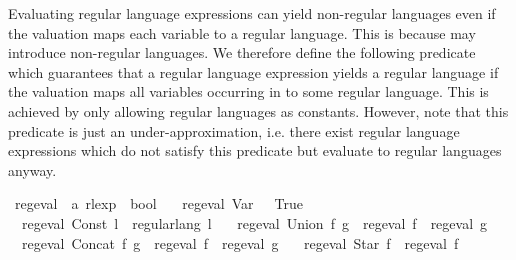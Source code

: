 \begin{isabellebody}
{}
\isamarkuptrue%
%
\endisatagdocument
{\isafolddocument}%
%
\isadelimdocument
%
\endisadelimdocument
%
\begin{isamarkuptext}%
Evaluating regular language expressions can yield non-regular languages even if
the valuation maps each variable to a regular language. This is because  may introduce
non-regular languages.
We therefore define the following predicate which guarantees that a regular language expression
 yields a regular language if the valuation maps all variables occurring in  to some regular
language. This is achieved by only allowing regular languages as constants.
However, note that this predicate is just an under-approximation, i.e. there exist regular language
expressions which do not satisfy this predicate but evaluate to regular languages anyway.%
\end{isamarkuptext}\isamarkuptrue%
\isamarkupfalse%
\ reg{\isacharunderscore}{\kern0pt}eval\ {\isacharcolon}{\kern0pt}{\isacharcolon}{\kern0pt}\ {\isachardoublequoteopen}{\isacharprime}{\kern0pt}a\ rlexp\ {\isasymRightarrow}\ bool{\isachardoublequoteclose}\ \isanewline
\ \ {\isachardoublequoteopen}reg{\isacharunderscore}{\kern0pt}eval\ {\isacharparenleft}{\kern0pt}Var\ {\isacharunderscore}{\kern0pt}{\isacharparenright}{\kern0pt}\ {\isasymlongleftrightarrow}\ True{\isachardoublequoteclose}\ {\isacharbar}{\kern0pt}\isanewline
\ \ {\isachardoublequoteopen}reg{\isacharunderscore}{\kern0pt}eval\ {\isacharparenleft}{\kern0pt}Const\ l{\isacharparenright}{\kern0pt}\ {\isasymlongleftrightarrow}\ regular{\isacharunderscore}{\kern0pt}lang\ l{\isachardoublequoteclose}\ {\isacharbar}{\kern0pt}\isanewline
\ \ {\isachardoublequoteopen}reg{\isacharunderscore}{\kern0pt}eval\ {\isacharparenleft}{\kern0pt}Union\ f\ g{\isacharparenright}{\kern0pt}\ {\isasymlongleftrightarrow}\ reg{\isacharunderscore}{\kern0pt}eval\ f\ {\isasymand}\ reg{\isacharunderscore}{\kern0pt}eval\ g{\isachardoublequoteclose}\ {\isacharbar}{\kern0pt}\isanewline
\ \ {\isachardoublequoteopen}reg{\isacharunderscore}{\kern0pt}eval\ {\isacharparenleft}{\kern0pt}Concat\ f\ g{\isacharparenright}{\kern0pt}\ {\isasymlongleftrightarrow}\ reg{\isacharunderscore}{\kern0pt}eval\ f\ {\isasymand}\ reg{\isacharunderscore}{\kern0pt}eval\ g{\isachardoublequoteclose}\ {\isacharbar}{\kern0pt}\isanewline
\ \ {\isachardoublequoteopen}reg{\isacharunderscore}{\kern0pt}eval\ {\isacharparenleft}{\kern0pt}Star\ f{\isacharparenright}{\kern0pt}\ {\isasymlongleftrightarrow}\ reg{\isacharunderscore}{\kern0pt}eval\ f{\isachardoublequoteclose}\isanewline

\end{isabellebody}
